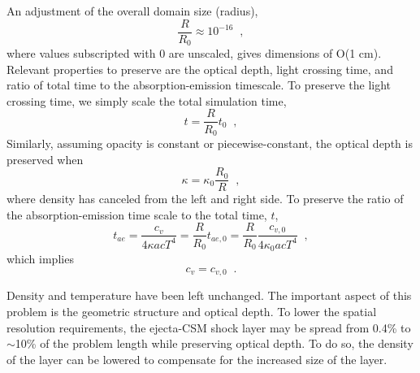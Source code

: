 \documentclass[]{article}
\begin{document}
		An adjustment of the overall domain size (radius),
		\begin{equation}
			\frac{R}{R_0} \approx 10^{-16} \;\;,
		\end{equation}
		where values subscripted with $0$ are unscaled, gives dimensions of O(1 cm). Relevant properties to preserve are the optical depth, light crossing time, and ratio of total time to the absorption-emission timescale. To preserve the light crossing time, we simply scale the total simulation time,
		\begin{equation}
			t = \frac{R}{R_0}t_0 \;\;,
		\end{equation}
		Similarly, assuming opacity is constant or piecewise-constant, the optical depth is preserved when
		\begin{equation}
			\kappa = \kappa_0\frac{R_0}{R} \;\;,
		\end{equation}
		where density has canceled from the left and right side. To preserve the ratio of the absorption-emission time scale to the total time, $t$,
		\begin{equation}
			t_{ae} = \frac{c_v}{4\kappa acT^4} = \frac{R}{R_0}t_{ae,0}
			= \frac{R}{R_0}\frac{c_{v,0}}{4\kappa_0 acT^4} \;\;,
		\end{equation}
		which implies
		\begin{equation}
			c_v = c_{v,0} \;\;.
		\end{equation}

		Density and temperature have been left unchanged. The important aspect of this problem is the geometric structure and optical depth. To lower the spatial resolution requirements, the ejecta-CSM shock layer may be spread from 0.4\% to $\sim$10\% of the problem length while preserving optical depth. To do so, the density of the layer can be lowered to compensate for the increased size of the layer.
\end{document}
